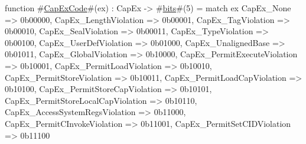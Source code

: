 function #\hyperref[sailRISCVzCapExCode]{CapExCode}#(ex) : CapEx -> #\hyperref[sailRISCVzbits]{bits}#(5) =
  match ex {
    CapEx_None                          => 0b00000,
    CapEx_LengthViolation               => 0b00001,
    CapEx_TagViolation                  => 0b00010,
    CapEx_SealViolation                 => 0b00011,
    CapEx_TypeViolation                 => 0b00100,
    CapEx_UserDefViolation              => 0b01000,
    CapEx_UnalignedBase                 => 0b01011,
    CapEx_GlobalViolation               => 0b10000,
    CapEx_PermitExecuteViolation        => 0b10001,
    CapEx_PermitLoadViolation           => 0b10010,
    CapEx_PermitStoreViolation          => 0b10011,
    CapEx_PermitLoadCapViolation        => 0b10100,
    CapEx_PermitStoreCapViolation       => 0b10101,
    CapEx_PermitStoreLocalCapViolation  => 0b10110,
    CapEx_AccessSystemRegsViolation     => 0b11000,
    CapEx_PermitCInvokeViolation        => 0b11001,
    CapEx_PermitSetCIDViolation         => 0b11100
  }
